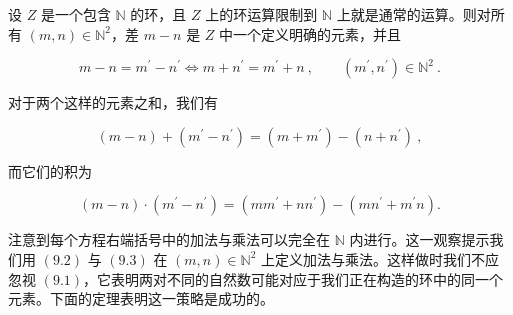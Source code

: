设 $Z$ 是一个包含 $\mathbb{N}$ 的环，且 $Z$ 上的环运算限制到 $\mathbb{N}$ 上就是通常的运算。则对所有 $(m, n) \in \mathbb{N}^2$，差 $m - n$ 是 $Z$ 中一个定义明确的元素，并且

\begin{equation}
m-n=m^{\prime}-n^{\prime}\Longleftrightarrow m+n^{\prime}=m^{\prime}+n~,\qquad(m^{\prime},n^{\prime})\in\mathbb{N}^{2}~.
\end{equation}

对于两个这样的元素之和，我们有

\begin{equation}
(m-n)+(m^{\prime}-n^{\prime})=(m+m^{\prime})-(n+n^{\prime})~,
\end{equation}

而它们的积为

\begin{equation}
(m-n)\cdot(m^{\prime}-n^{\prime})=(mm^{\prime}+nn^{\prime})-(mn^{\prime}+m^{\prime}n).
\end{equation}

注意到每个方程右端括号中的加法与乘法可以完全在 $ \mathbb{N} $ 内进行。这一观察提示我们用 $ (9.2) $ 与 $ (9.3) $ 在 $ (m, n) \in \mathbb{N}^2 $ 上定义加法与乘法。这样做时我们不应忽视 $ (9.1) $，它表明两对不同的自然数可能对应于我们正在构造的环中的同一个元素。下面的定理表明这一策略是成功的。

